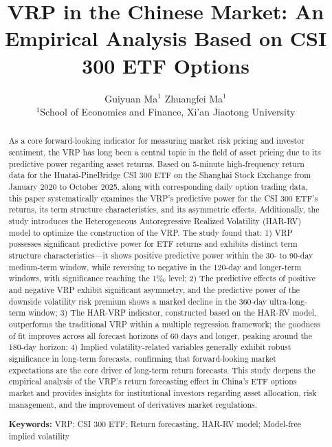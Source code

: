 \documentclass[a4paper, 12pt]{article}    %
\title{ VRP in the Chinese Market: An Empirical Analysis Based on CSI 300 ETF Options}
\author{
    Guiyuan Ma$^{1}$ \qquad Zhuangfei Ma$^{1}$%
    \\
    $^{1}$School of Economics and Finance, Xi'an Jiaotong University %
}
\date{}  %
\begin{document}
\maketitle

	\begin{abstract}
		As a core forward-looking indicator for measuring market risk pricing and investor sentiment, the VRP has long been a central topic in the field of asset pricing due to its predictive power regarding asset returns. Based on 5-minute high-frequency return data for the Huatai-PineBridge CSI 300 ETF on the Shanghai Stock Exchange from January 2020 to October 2025, along with corresponding daily option trading data, this paper systematically examines the VRP’s predictive power for the CSI 300 ETF’s returns, its term structure characteristics, and its asymmetric effects. Additionally, the study introduces the Heterogeneous Autoregressive Realized Volatility (HAR-RV) model to optimize the construction of the VRP. The study found that: 1) VRP possesses significant predictive power for ETF returns and exhibits distinct term structure characteristics—it shows positive predictive power within the 30- to 90-day medium-term window, while reversing to negative in the 120-day and longer-term windows, with significance reaching the 1‰ level; 2) The predictive effects of positive and negative VRP exhibit significant asymmetry, and the predictive power of the downside volatility risk premium shows a marked decline in the 360-day ultra-long-term window; 3) The HAR-VRP indicator, constructed based on the HAR-RV model, outperforms the traditional VRP within a multiple regression framework; the goodness of fit improves across all forecast horizons of 60 days and longer, peaking around the 180-day horizon; 4) Implied volatility-related variables generally exhibit robust significance in long-term forecasts, confirming that forward-looking market expectations are the core driver of long-term return forecasts. This study deepens the empirical analysis of the VRP’s return forecasting effect in China’s ETF options market and provides insights for institutional investors regarding asset allocation, risk management, and the improvement of derivatives market regulations.
        \par\textbf{Keywords:} VRP; CSI 300 ETF; Return forecasting, HAR-RV model; Model-free implied volatility
	\end{abstract}

\newpage  %
\end{document}
